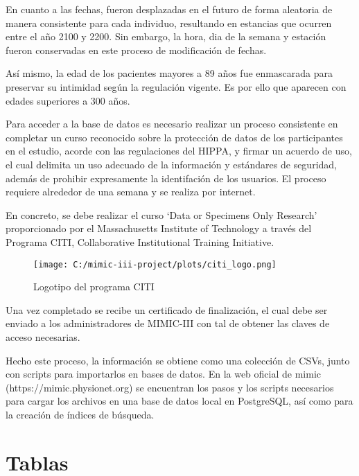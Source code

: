 \documentclass{report}
\begin{document}
En cuanto a las fechas, fueron desplazadas en el futuro de forma aleatoria de manera consistente para cada individuo, resultando en estancias que ocurren entre el año 2100 y 2200. Sin embargo, la hora, dia de la semana y estación fueron conservadas en este proceso de modificación de fechas. 

Así mismo, la edad de los pacientes mayores a 89 años fue enmascarada para preservar su intimidad según la regulación vigente. Es por ello que aparecen con edades superiores a 300 años. 

Para acceder a la base de datos es necesario realizar un proceso consistente en completar un curso reconocido sobre la protección de datos de los participantes en el estudio, acorde con las regulaciones del HIPPA, y firmar un acuerdo de uso, el cual delimita un uso adecuado de la información y estándares de seguridad, además de prohibir expresamente la identifación de los usuarios. El proceso requiere alrededor de una semana y se realiza por internet. 

En concreto, se debe realizar el curso  ‘Data or Specimens Only Research’ proporcionado por el Massachusetts Institute of Technology  a través del Programa CITI, Collaborative Institutional Training Initiative.  

\begin{figure}[h]
\centering
\texttt{[image: C:/mimic-iii-project/plots/citi\_logo.png]}
\caption{Logotipo del programa CITI}
\end{figure}

Una vez completado se recibe un certificado de finalización, el cual debe ser enviado a los administradores de MIMIC-III con tal de obtener las claves de acceso necesarias.

Hecho este proceso, la información se obtiene como una colección de CSVs, junto con scripts para importarlos en bases de datos. En la web oficial de mimic (https://mimic.physionet.org) se encuentran los pasos y los scripts necesarios para cargar los archivos en una base de datos local en PostgreSQL, así como para la creación de índices de búsqueda. 

\section{Tablas}
\end{document}
